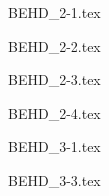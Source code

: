 \documentclass[books,12pt]{elegantpaper}
\begin{document}
{BEHD_2-1.tex}




{BEHD_2-2.tex}


{BEHD_2-3.tex}


{BEHD_2-4.tex}




\newpage
{}

{BEHD_3-1.tex}






{BEHD_3-3.tex}










\nocite{EINAV2010,Havrylchyk2018} 



\end{document}
